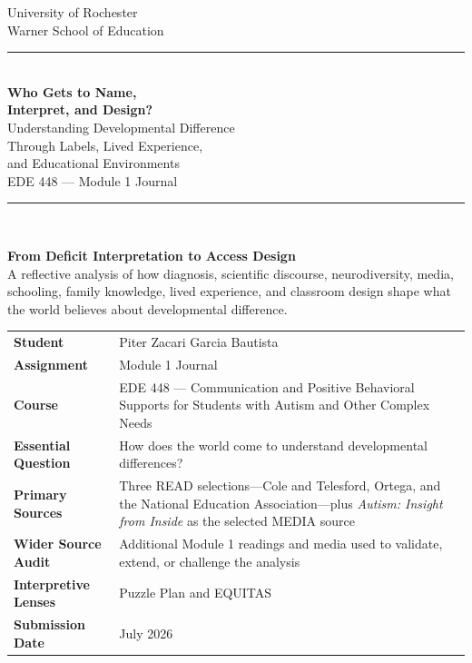 \documentclass[11pt]{article}
\begin{document}
\hypersetup{pageanchor=false}
\begin{titlepage}
\thispagestyle{empty}

\begin{center}
{\large University of Rochester\\}
{\normalsize Warner School of Education\\[0.15in]}

{\color{PrimaryRed}\rule{\textwidth}{1.4pt}}\\[0.12in]
{\Huge\bfseries Who Gets to Name,\\[0.07in]
Interpret, and Design?}\\[0.15in]
{\huge Understanding Developmental Difference\\[0.07in]
Through Labels, Lived Experience,\\[0.07in]
and Educational Environments}\\[0.18in]
{\Large EDE 448 --- Module 1 Journal}\\[0.12in]

\vfill

{\color{PrimaryRed}\rule{0.78\textwidth}{0.7pt}}\\[0.22in]

\colorbox{SoftBlue}{%
\parbox{0.88\textwidth}{%
\centering\small\vspace{0.02in}
\textbf{From Deficit Interpretation to Access Design}\\[0.05in]
A reflective analysis of how diagnosis, scientific discourse, neurodiversity, media, schooling, family knowledge, lived experience, and classroom design shape what the world believes about developmental difference.
}%
}
\end{center}

\vfill

\begin{center}
\renewcommand{\arraystretch}{1.18}
\setlength{\tabcolsep}{4pt}
\begin{tabular}{>{\bfseries\RaggedLeft\arraybackslash}p{1.65in} >{\RaggedRight\arraybackslash}p{5.0in}}
Student & Piter Zacari Garcia Bautista \\
Assignment & Module 1 Journal \\
Course & EDE 448 --- Communication and Positive Behavioral Supports for Students with Autism and Other Complex Needs \\
Essential Question & How does the world come to understand developmental differences? \\
Primary Sources & Three READ selections---Cole and Telesford, Ortega, and the National Education Association---plus \textit{Autism: Insight from Inside} as the selected MEDIA source \\
Wider Source Audit & Additional Module 1 readings and media used to validate, extend, or challenge the analysis \\
Interpretive Lenses & Puzzle Plan and EQUITAS \\
Submission Date & July 2026 \\
\end{tabular}
\end{center}


\end{titlepage}
\end{document}
